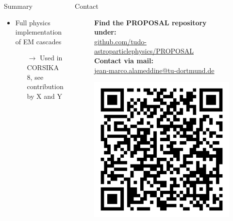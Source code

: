 \documentclass[t]{beamer}
\begin{document}
  \begin{columns}[onlytextwidth]%
    \begin{column}{0.4\textwidth}%
      \begin{block}[equal height group=Z]{Summary}%
        \begin{itemize}
          \item Full physics implementation of EM cascades
          \begin{itemize}
            \item[$\rightarrow$] Used in CORSIKA 8, see contribution by X and Y
          \end{itemize}
        \end{itemize}
      \end{block}
    \end{column}
    \begin{column}{0.4\textwidth}%
      \begin{block}[equal height group=Z]{Contact}%
        \begin{center}
          \begin{figure}[ht]
            \begin{minipage}[ht]{0.75\linewidth}
              \textbf{Find the PROPOSAL repository under:}\\ \url{github.com/tudo-astroparticlephysics/PROPOSAL} \vspace{0.5em}\\
              \textbf{Contact via mail:}\\ \href{mailto:me@jean-marco.alameddine@tu-dortmund.de}{jean-marco.alameddine@tu-dortmund.de} 
            \end{minipage}
            \begin{minipage}[ht]{0.24\linewidth}
              \centering
                \includegraphics[width=0.66\linewidth, valign=t]{images/qr_proposal.png}
            \end{minipage}
          \end{figure}
        \end{center}
      \end{block}
    \end{column}
    \end{columns}
\end{document}
